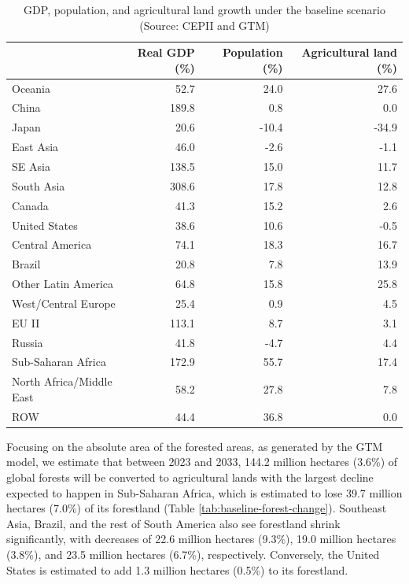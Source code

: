 \documentclass[
]{article}
\begin{document}
\begin{table}
\centering
\caption{\label{tab:baseline-growth}GDP, population, and agricultural land growth under the baseline scenario (Source: CEPII and GTM)}
\centering
\begin{tabular}[t]{|>{}l|r|r|>{}r|}
\hline
  & Real GDP (\%) & Population (\%) & Agricultural land (\%)\\
\hline
Oceania & 52.7 & 24.0 & 27.6\\
\hline
China & 189.8 & 0.8 & 0.0\\
\hline
Japan & 20.6 & -10.4 & -34.9\\
\hline
East Asia & 46.0 & -2.6 & -1.1\\
\hline
SE Asia & 138.5 & 15.0 & 11.7\\
\hline
South Asia & 308.6 & 17.8 & 12.8\\
\hline
Canada & 41.3 & 15.2 & 2.6\\
\hline
United States & 38.6 & 10.6 & -0.5\\
\hline
Central America & 74.1 & 18.3 & 16.7\\
\hline
Brazil & 20.8 & 7.8 & 13.9\\
\hline
Other Latin America & 64.8 & 15.8 & 25.8\\
\hline
West/Central Europe & 25.4 & 0.9 & 4.5\\
\hline
EU II & 113.1 & 8.7 & 3.1\\
\hline
Russia & 41.8 & -4.7 & 4.4\\
\hline
Sub-Saharan Africa & 172.9 & 55.7 & 17.4\\
\hline
North Africa/Middle East & 58.2 & 27.8 & 7.8\\
\hline
ROW & 44.4 & 36.8 & 0.0\\
\hline
\end{tabular}
\end{table}

Focusing on the absolute area of the forested areas, as generated by the GTM model, we estimate that between 2023 and 2033, 144.2 million hectares (3.6\%) of global forests will be converted to agricultural lands with the largest decline expected to happen in Sub-Saharan Africa, which is estimated to lose 39.7 million hectares (7.0\%) of its forestland (Table \ref{tab:baseline-forest-change}). Southeast Asia, Brazil, and the rest of South America also see forestland shrink significantly, with decreases of 22.6 million hectares (9.3\%), 19.0 million hectares (3.8\%), and 23.5 million hectares (6.7\%), respectively. Conversely, the United States is estimated to add 1.3 million hectares (0.5\%) to its forestland.
\end{document}
